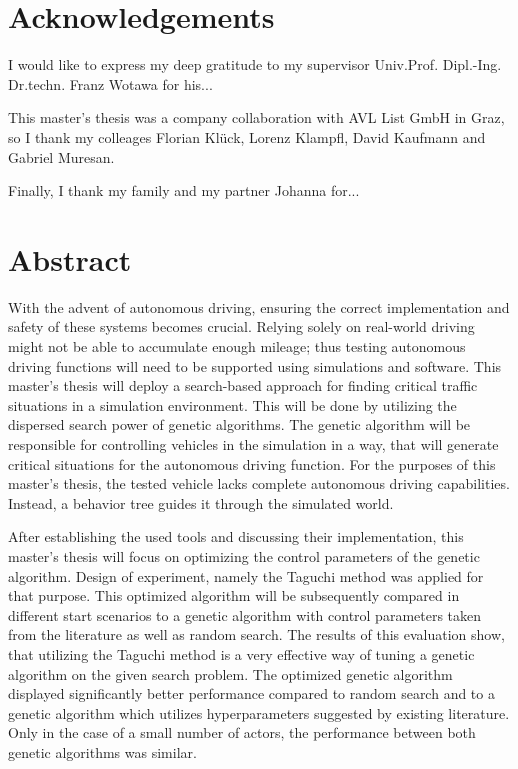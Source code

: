 \chapter*{Acknowledgements}
\label{chap:acknowledgements}

I would like to express my deep gratitude to my supervisor Univ.Prof. Dipl.-Ing. Dr.techn. Franz Wotawa for his...

This master's thesis was a company collaboration with AVL List GmbH in Graz, so I thank my colleages Florian Klück, Lorenz Klampfl, David Kaufmann and Gabriel Muresan.

Finally, I thank my family and my partner Johanna for...

\chapter*{Abstract}
\label{chap:abstract}

With the advent of autonomous driving, ensuring the correct implementation and safety of these systems becomes crucial. Relying solely on real-world driving might not be able to accumulate enough mileage; thus testing autonomous driving functions will need to be supported using simulations and software. This master's thesis will deploy a search-based approach for finding critical traffic situations in a simulation environment. This will be done by utilizing the dispersed search power of genetic algorithms. The genetic algorithm will be responsible for controlling vehicles in the simulation in a way, that will generate critical situations for the autonomous driving function. For the purposes of this master's thesis, the tested vehicle lacks complete autonomous driving capabilities. Instead, a behavior tree guides it through the simulated world.

After establishing the used tools and discussing their implementation, this master's thesis will focus on optimizing the control parameters of the genetic algorithm. Design of experiment, namely the Taguchi method was applied for that purpose. This optimized algorithm will be subsequently compared in different start scenarios to a genetic algorithm with control parameters taken from the literature as well as random search. The results of this evaluation show, that utilizing the Taguchi method is a very effective way of tuning a genetic algorithm on the given search problem. The optimized genetic algorithm displayed significantly better performance compared to random search and to a genetic algorithm which utilizes hyperparameters suggested by existing literature. Only in the case of a small number of actors, the performance between both genetic algorithms was similar.


